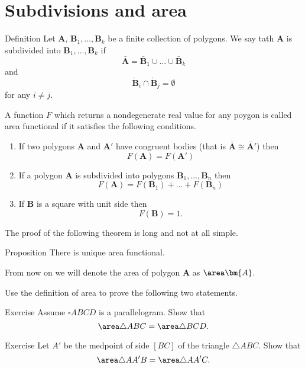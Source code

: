\section*{Subdivisions and area}

\begin{thm}{Definition}
Let $\bm{A}$, $\bm{B}_1,\dots,\bm{B}_k$
be a finite collection of polygons.
We say tath $\bm{A}$ 
is subdivided into $\bm{B}_1,\dots,\bm{B}_k$
if 
\[\bar{\bm{A}}=\bar{\bm{B}}_1\cup\dots\cup\bar{\bm{B}}_k\]
and 
\[\mathring{\bm{B}}_i\cap\mathring{\bm{B}}_j=\emptyset\]
for any $i\ne j$.
\end{thm}

A function $F$ which returns a nondegenerate real value for any poygon 
is called area functional if it satisfies the following conditions.

\begin{enumerate}
\item If  two polygons $\bm{A}$ and $\bm{A}'$ have congruent bodies (that is $\bar{\bm{A}}\cong \bar{\bm{A}}'$)
then 
\[F(\bm{A})=F(\bm{A}')\]
\item If a polygon $\bm{A}$ is subdivided into polygons $\bm{B}_1, \dots,\bm{B}_n$
then 
\[F(\bm{A})=F(\bm{B}_1)+\dots+F(\bm{B}_n)\]
\item If $\bm{B}$ is a square with unit side then 
\[F(\bm{B})=1.\]
\end{enumerate}

The proof of the following theorem is long and not at all simple.

\begin{thm}{Proposition}
There is unique area functional.
\end{thm}

From now on we will denote the area of polygon $\bm{A}$ as $\area \bm{A}$.

Use the definition of area to prove the following two statements.


\begin{thm}{Exercise}
Assume $\square ABCD$ is a parallelogram.
Show that 
\[\area\triangle ABC=\area\triangle BCD.\]

\end{thm}

\begin{thm}{Exercise}
Let $A'$ be the medpoint of side $[BC]$ of the triangle $\triangle ABC$.
Show that 
\[\area\triangle AA'B=\area\triangle AA'C.\]

\end{thm}



















